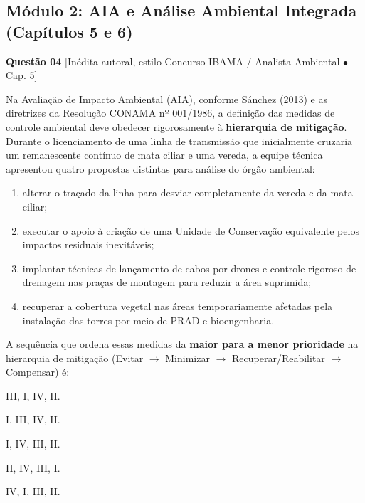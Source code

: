 \subsection*{Módulo 2: AIA e Análise Ambiental Integrada (Capítulos 5 e 6)}

\noindent\textbf{Questão 04} {\footnotesize\color{uefsMuted}[Inédita autoral, estilo Concurso IBAMA / Analista Ambiental $\bullet$ Cap. 5]}\par
Na Avaliação de Impacto Ambiental (AIA), conforme Sánchez (2013) e as diretrizes da Resolução CONAMA nº 001/1986, a definição das medidas de controle ambiental deve obedecer rigorosamente à \textbf{hierarquia de mitigação}. Durante o licenciamento de uma linha de transmissão que inicialmente cruzaria um remanescente contínuo de mata ciliar e uma vereda, a equipe técnica apresentou quatro propostas distintas para análise do órgão ambiental:
\begin{enumerate}[label=\Roman*., leftmargin=2.0em, itemsep=1.5pt, topsep=3pt]
  \item alterar o traçado da linha para desviar completamente da vereda e da mata ciliar;
  \item executar o apoio à criação de uma Unidade de Conservação equivalente pelos impactos residuais inevitáveis;
  \item implantar técnicas de lançamento de cabos por drones e controle rigoroso de drenagem nas praças de montagem para reduzir a área suprimida;
  \item recuperar a cobertura vegetal nas áreas temporariamente afetadas pela instalação das torres por meio de PRAD e bioengenharia.
\end{enumerate}
A sequência que ordena essas medidas da \textbf{maior para a menor prioridade} na hierarquia de mitigação (Evitar $\to$ Minimizar $\to$ Recuperar/Reabilitar $\to$ Compensar) é:
\begin{alternativas}
  \item III, I, IV, II.
  \item I, III, IV, II.
  \item I, IV, III, II.
  \item II, IV, III, I.
  \item IV, I, III, II.
\end{alternativas}

